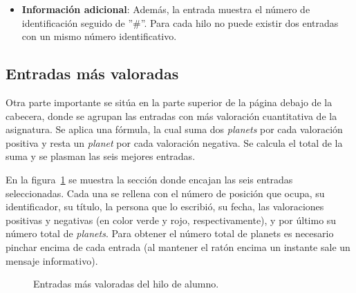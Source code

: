 \documentclass[a4paper, 12pt]{book}
\begin{document}
\begin{itemize}
  \item {\bfseries Informaci\'on adicional}: Adem\'as, la entrada muestra el n\'umero de identificaci\'on seguido de ''\#''. Para cada hilo no puede existir
  dos entradas con un mismo n\'umero identificativo.
\end{itemize}

\subsection{Entradas m\'as valoradas}
Otra parte importante se sit\'ua en la parte superior de la p\'agina debajo de la cabecera, donde se agrupan las entradas con m\'as valoraci\'on 
cuantitativa de la asignatura. Se aplica una f\'ormula, la cual suma dos \textit{planets} por cada valoraci\'on positiva y resta un \textit{planet} por 
cada valoraci\'on negativa. Se calcula el total de la suma y se plasman las seis mejores entradas.

En la figura~\ref{figura:hiloalumno3} se muestra la secci\'on donde encajan las seis entradas seleccionadas. Cada una se rellena con el n\'umero de 
posici\'on que ocupa, su identificador, su t\'itulo, la persona que lo escribi\'o, su fecha, las valoraciones positivas y negativas (en color verde y rojo,
respectivamente), y por \'ultimo su n\'umero total de \textit{planets}. Para obtener el n\'umero total de planets es necesario pinchar encima de cada 
entrada (al mantener el rat\'on encima un instante sale un mensaje informativo).
\begin{figure}[htbp] 
  \centering
  \caption{Entradas m\'as valoradas del hilo de alumno.}
  \label{figura:hiloalumno3}
\end{figure}
\end{document}
